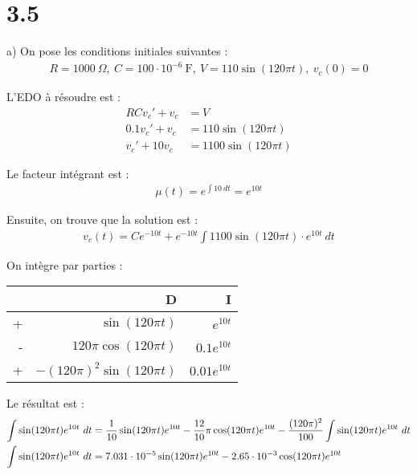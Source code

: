 \section*{3.5}

a) On pose les conditions initiales suivantes :
\begin{align*}
    R = 1000\ \Omega,\ C = 100\cdot 10^{-6}\ \text{F},\ V = 110\sin(120\pi t),\ 
    v_c(0) = 0
\end{align*}

L'EDO à résoudre est :
\begin{align*}
    RCv_c' +v_c &= V \\
    0.1v_c' +v_c &= 110\sin(120\pi t) \\
    v_c' +10v_c &= 1100\sin(120\pi t)
\end{align*}

Le facteur intégrant est :
\begin{align*}
    \mu(t) = e^{\int{10}\ dt} = e^{10t}
\end{align*}

Ensuite, on trouve que la solution est :
\begin{align*}
    v_c(t) = Ce^{-10t} + e^{-10t}\int{1100\sin(120\pi t)\cdot e^{10t}\ dt}
\end{align*}

On intègre par parties :
\begin{table}[H]
    \centering
    \begin{tabular}{rrr}
	\toprule[1pt]
	 & D & I \\
	\midrule
	+ & $\sin(120\pi t)$ & $e^{10t}$\vspace{1mm}\\
	- & $120\pi\cos(120\pi t)$ & $0.1e^{10t}$\vspace{2mm}\\
	+ & $-(120\pi)^2\sin(120\pi t)$ & $0.01e^{10t}$\vspace{2mm}\\
	\bottomrule[1pt]
    \end{tabular}
\end{table}

Le résultat est :
\begin{align*}
    \int{\sin(120\pi t)e^{10t}\ dt} &= \dfrac{1}{10}\sin(120\pi t)e^{10t}
    -\dfrac{12}{10}\pi\cos(120\pi t)e^{10t}
    -\dfrac{(120\pi)^2}{100}\int{\sin(120\pi t)e^{10t}\ dt} \\
    \int{\sin(120\pi t)e^{10t}\ dt} &= 7.031\cdot 10^{-5}\sin(120\pi t)e^{10t}
    -2.65\cdot 10^{-3}\cos(120\pi t)e^{10t}
\end{align*}

